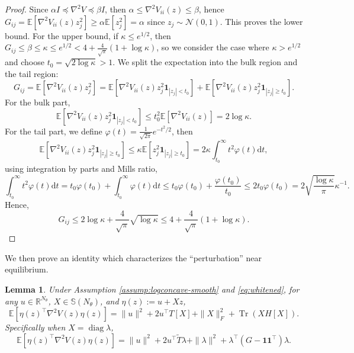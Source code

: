 \documentclass[11pt]{article}
\theoremstyle{plain}
\newtheorem{lemma}[theorem]{Lemma}
\theoremstyle{definition}
\theoremstyle{remark}
\newcommand{\R}{\mathbb{R}}
\newcommand{\N}{\mathcal{N}}
\newcommand{\E}{\mathbb{E}}
\newcommand{\Tr}{\operatorname{Tr}}
\newcommand{\diag}{\operatorname{diag}}
\newcommand{\Sym}{\mathbb{S}}
\newcommand{\dd}{\mathrm{d}}
\begin{document}
\begin{proof}
    Since $\alpha I \preceq \nabla^2 V \preceq \beta I$, then $\alpha \leq \nabla^2 V_{ii} (z) \leq \beta$, hence $G_{ij} = \E[\nabla^2 V_{ii} (z) z_j^2] \geq \alpha \E[z_j^2] = \alpha$ since $z_j \sim \N (0, 1)$. This proves the lower bound. For the upper bound, if $\kappa \leq e^{1/2}$, then $G_{ij} \leq \beta \leq \kappa \leq e^{1/2} < 4 + \frac{4}{\sqrt{\pi}} ( 1 + \log \kappa)$, so we consider the case where $\kappa > e^{1/2}$ and choose $t_0 = \sqrt{2 \log \kappa}> 1$. We split the expectation into the bulk region and the tail region:
    \begin{equation*}
        G_{ij} = \E[\nabla^2 V_{ii} (z) z_j^2] = \E[\nabla^2 V_{ii} (z) z_j^2 \mathbf{1}_{|z_j| < t_0}] + \E[\nabla^2 V_{ii} (z) z_j^2 \mathbf{1}_{|z_j| \geq t_0}].
    \end{equation*}
    For the bulk part,
    \begin{equation*}
        \E[\nabla^2 V_{ii} (z) z_j^2 \mathbf{1}_{|z_j| < t_0}] \leq t_0^2 \E[\nabla^2 V_{ii} (z)] = 2 \log \kappa.
    \end{equation*}
    For the tail part, we define $\varphi (t) = \frac{1}{\sqrt{2\pi}} e^{-t^2 / 2}$, then
    \begin{equation*}
        \E[\nabla^2 V_{ii} (z) z_j^2 \mathbf{1}_{|z_j| \geq t_0}] \leq \kappa \E[z_j^2 \mathbf{1}_{|z_j| \geq t_0}] = 2 \kappa \int_{t_0}^\infty t^2 \varphi(t) \dd t,
    \end{equation*}
    using integration by parts and Mills ratio,
    \begin{equation*}
        \int_{t_0}^\infty t^2 \varphi(t) \dd t = t_0 \varphi (t_0) + \int_{t_0}^\infty \varphi(t) \dd t \leq t_0 \varphi (t_0) + \frac{\varphi (t_0)}{t_0} \leq 2t_0 \varphi(t_0) = 2\sqrt{\frac{\log \kappa}{\pi}} \kappa^{-1}.
    \end{equation*}
    Hence,
    \begin{equation*}
        G_{ij} \leq 2 \log \kappa + \frac{4}{\sqrt{\pi}} \sqrt{\log \kappa} \leq 4 + \frac{4}{\sqrt{\pi}} (1 + \log \kappa).
    \end{equation*}
\end{proof}

We then prove an identity which characterizes the ``perturbation'' near equilibrium.

\begin{lemma}\label{lem:bochner}
    Under Assumption \ref{assump:logconcave-smooth} and \eqref{eq:whitened}, for any $u \in \R^{N_\theta}$, $X \in \Sym (N_\theta)$, and $\eta(z) := u + Xz$, 
    \begin{equation*}
        \E[\eta(z)^\top \nabla^2 V(z) \eta (z)] = \|u\|^2 + 2 u^\top T[X] + \|X\|_F^2 + \Tr(X H[X]).
    \end{equation*}
    Specifically when $X = \diag \lambda$,
    \begin{equation*}
        \E[\eta(z)^\top \nabla^2 V(z) \eta (z)] = \|u\|^2 + 2 u^\top \widetilde{T} \lambda + \|\lambda\|^2 + \lambda^\top (G - \mathbf{1} \mathbf{1}^\top) \lambda.
    \end{equation*}
\end{lemma}
\end{document}
